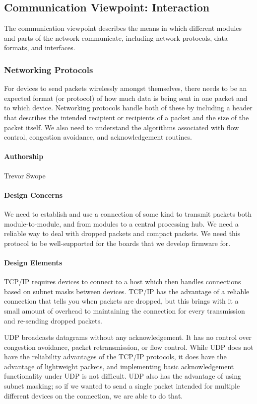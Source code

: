 \documentclass[onecolumn, draftclsnofoot,10pt, compsoc]{IEEEtran}
\begin{document}
\subsection{Communication Viewpoint: Interaction}
    The communication viewpoint describes the means in which different modules and parts of the network communicate, including network protocols, data formats, and interfaces.

\subsubsection{Networking Protocols}
    For devices to send packets wirelessly amongst themselves, there needs to be an expected format (or protocol) of how much data is being sent in one packet and to which device. Networking protocols handle both of these by including a header that describes the intended recipient or recipients of a packet and the size of the packet itself. We also need to understand the algorithms associated with flow control, congestion avoidance, and acknowledgement routines.

\paragraph{Authorship}
    Trevor Swope

\paragraph{Design Concerns}
    We need to establish and use a connection of some kind to transmit packets both module-to-module, and from modules to a central processing hub. We need a reliable way to deal with dropped packets and compact packets. We need this protocol to be well-supported for the boards that we develop firmware for.

\paragraph{Design Elements}
    TCP/IP requires devices to connect to a host which then handles connections based on subnet masks between devices. TCP/IP has the advantage of a reliable connection that tells you when packets are dropped, but this brings with it a small amount of overhead to maintaining the connection for every transmission and re-sending dropped packets. \cite{TCP}

    UDP broadcasts datagrams without any acknowledgement. It has no control over congestion avoidance, packet retransmission, or flow control. While UDP does not have the reliability advantages of the TCP/IP protocols, it does have the advantage of lightweight packets, and implementing basic acknowledgement functionality under UDP is not difficult. UDP also has the advantage of using subnet masking; so if we wanted to send a single packet intended for multiple different devices on the connection, we are able to do that. \cite{UDP}
\end{document}
